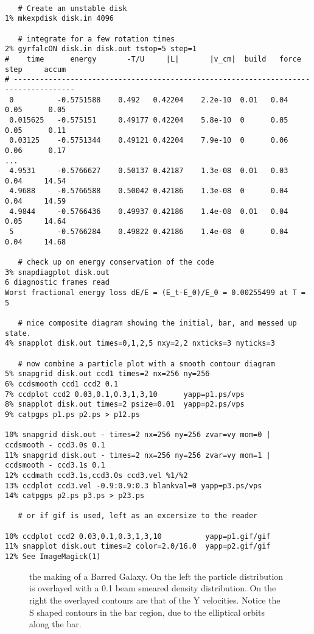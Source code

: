\footnotesize\begin{verbatim}

   # Create an unstable disk
1% mkexpdisk disk.in 4096 

   # integrate for a few rotation times
2% gyrfalcON disk.in disk.out tstop=5 step=1
#    time      energy       -T/U     |L|       |v_cm|  build   force    step     accum
# ------------------------------------------------------------------------------------
 0          -0.5751588    0.492   0.42204    2.2e-10  0.01   0.04       0.05      0.05
 0.015625   -0.575151     0.49177 0.42204    5.8e-10  0      0.05       0.05      0.11
 0.03125    -0.5751344    0.49121 0.42204    7.9e-10  0      0.06       0.06      0.17
...
 4.9531     -0.5766627    0.50137 0.42187    1.3e-08  0.01   0.03       0.04     14.54
 4.9688     -0.5766588    0.50042 0.42186    1.3e-08  0      0.04       0.04     14.59
 4.9844     -0.5766436    0.49937 0.42186    1.4e-08  0.01   0.04       0.05     14.64
 5          -0.5766284    0.49822 0.42186    1.4e-08  0      0.04       0.04     14.68

   # check up on energy conservation of the code
3% snapdiagplot disk.out
6 diagnostic frames read
Worst fractional energy loss dE/E = (E_t-E_0)/E_0 = 0.00255499 at T = 5

   # nice composite diagram showing the initial, bar, and messed up state.
4% snapplot disk.out times=0,1,2,5 nxy=2,2 nxticks=3 nyticks=3

   # now combine a particle plot with a smooth contour diagram
5% snapgrid disk.out ccd1 times=2 nx=256 ny=256
6% ccdsmooth ccd1 ccd2 0.1
7% ccdplot ccd2 0.03,0.1,0.3,1,3,10      yapp=p1.ps/vps
8% snapplot disk.out times=2 psize=0.01  yapp=p2.ps/vps 
9% catpgps p1.ps p2.ps > p12.ps

10% snapgrid disk.out - times=2 nx=256 ny=256 zvar=vy mom=0 | ccdsmooth - ccd3.0s 0.1
11% snapgrid disk.out - times=2 nx=256 ny=256 zvar=vy mom=1 | ccdsmooth - ccd3.1s 0.1
12% ccdmath ccd3.1s,ccd3.0s ccd3.vel %1/%2
13% ccdplot ccd3.vel -0.9:0.9:0.3 blankval=0 yapp=p3.ps/vps
14% catpgps p2.ps p3.ps > p23.ps

   # or if gif is used, left as an excersize to the reader

10% ccdplot ccd2 0.03,0.1,0.3,1,3,10          yapp=p1.gif/gif
11% snapplot disk.out times=2 color=2.0/16.0  yapp=p2.gif/gif
12% See ImageMagick(1)

\end{verbatim}\normalsize

\begin{figure}[t]
\caption[A Barred Galaxy]
{the making of a Barred Galaxy. On the left the particle distribution
is overlayed with a 0.1 beam smeared density distribution. On the right
the overlayed contours are that of the Y velocities. Notice the S shaped
contours in the bar region, due to the elliptical orbits along the bar.
}
\end{figure}


